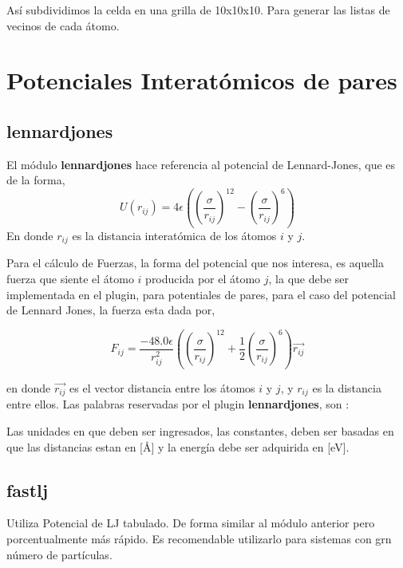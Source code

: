 As\'i subdividimos la celda en una grilla de 10x10x10. Para generar las listas de vecinos de cada \'atomo.
\section{Potenciales Interat\'omicos de pares}
\subsection{lennardjones}
El m\'odulo \textbf{lennardjones} hace referencia al potencial de Lennard-Jones, que es de la forma,
$$U(r_{ij}) = 4\epsilon\left(\left(\frac{\sigma}{r_{ij}}\right)^{12}-\left(\frac{\sigma}{r_{ij}}\right)^6\right)$$
En donde $r_{ij}$ es la distancia interat\'omica de los \'atomos $i$ y $j$. 

Para el c\'alculo de Fuerzas, la forma del potencial que nos interesa, es aquella fuerza que siente el \'atomo $i$ producida por el \'atomo $j$, la que debe ser implementada en el plugin, para potentiales de pares, para el caso del potencial de Lennard Jones, la fuerza esta dada por,

$$F_{ij} = \frac{-48.0\epsilon}{r_{ij}^2}\left( \left(\frac{\sigma}{r_{ij}}\right)^{12} + \frac{1}{2}\left(\frac{\sigma}{r_{ij}}\right)^6 \right) \vec{r_{ij}}$$

en donde $\vec{r_{ij}}$ es el vector distancia entre los \'atomos $i$ y $j$, y $r_{ij}$ es la distancia entre ellos. 
Las palabras reservadas por el plugin \textbf{lennardjones}, son :


Las unidades en que deben ser ingresados, las constantes, deben ser basadas en que las distancias estan en [\AA] y la energ\'ia debe ser adquirida en [eV].


\subsection{fastlj}
Utiliza Potencial de LJ tabulado. De forma similar al m\'odulo anterior pero porcentualmente m\'as r\'apido. Es recomendable utilizarlo para sistemas con grn n\'umero de part\'iculas.

